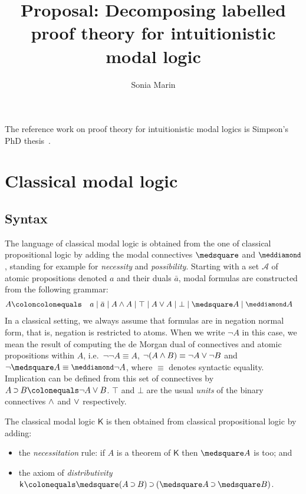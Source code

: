 \documentclass{article}
\title{Proposal: Decomposing labelled proof theory for intuitionistic modal logic}
\author{Sonia Marin}
\newcommand*{\NEG}[1]{\bar{#1}}
\newcommand*{\NOT}{\neg}
\newcommand*{\AND}{\mathbin{\scalebox{.85}{\raise.1ex\hbox{\large$\wedge$}}}}
\newcommand*{\TOP}{\mathord{\top}}
\newcommand*{\OR}{\mathbin{\scalebox{.85}{\raise.1ex\hbox{\large$\vee$}}}}
\newcommand*{\BOT}{\mathord{\bot}}
\newcommand*{\IMP}{\mathbin{\scalebox{.6}{\raise.4ex\hbox{\large$\bm\supset$}}}}%
\newcommand*{\BOX}{\mathord{\medsquare}}
\newcommand*{\DIA}{\mathord{\scalebox{.9}{\raise.1ex\hbox{$\meddiamond$}}}}
\newcommand*{\ax}[1]{\mathsf{#1}}
\newcommand*{\kax}[1][]		{\ax{k_{#1}}}
\newcommand*{\A}{\mathcal{A}}
\newcommand*{\sys}[1]{\ensuremath{\mathsf{#1}}}%
\newcommand*{\K}{\sys{K}}
\begin{document}
	
\maketitle

The reference work on proof theory for intuitionistic modal logics is Simpson's PhD thesis~\cite{simpson:phd94}.

\section{Classical modal logic}

\subsection{Syntax}

The language of classical modal logic is obtained from the one of classical propositional logic by adding the modal connectives $\BOX$ and $\DIA$, standing for example for \emph{necessity} and \emph{possibility}.
%
Starting with a set $\A$ of atomic propositions denoted $a$ and their duals $\NEG a$, modal formulas are constructed from the following grammar:
%
\begin{align*}
	A \coloncolonequals & \quad a \mid \NEG a \mid A \AND A \mid \TOP \mid A \OR A \mid \BOT \mid \BOX A \mid \DIA A 
\end{align*}
%
In a classical setting, we always assume that formulas are in negation normal form, that is, negation is restricted to atoms. 
%
When we write $\NOT A$ in this case, we mean the result of computing the de Morgan dual of connectives and atomic propositions within $A$,
i.e.~$\NOT{\NOT A} \equiv A$, $\NOT(A\AND B) \equiv \NOT A\OR\NOT B$ and $\NOT{\BOX A} \equiv \DIA \NOT A$, where $\equiv$ denotes syntactic equality.
%
Implication can be defined from this set of connectives by $A \IMP B \colonequals \NOT A \OR B$.
%
$\TOP$ and $\BOT$ are the usual \emph{units} of the binary connectives $\AND$ and $\OR$ respectively.

The classical modal logic $\K$ is then obtained from classical propositional logic by adding:
%
\begin{itemize}
	\item the \emph{necessitation} rule: if $A$ is a theorem of $\K$ then $\BOX A$ is too; and
	\item the axiom of \emph{distributivity} $\kax \colonequals \BOX(A \IMP B) \IMP (\BOX A \IMP \BOX B)$.
\end{itemize}	

\end{document}
